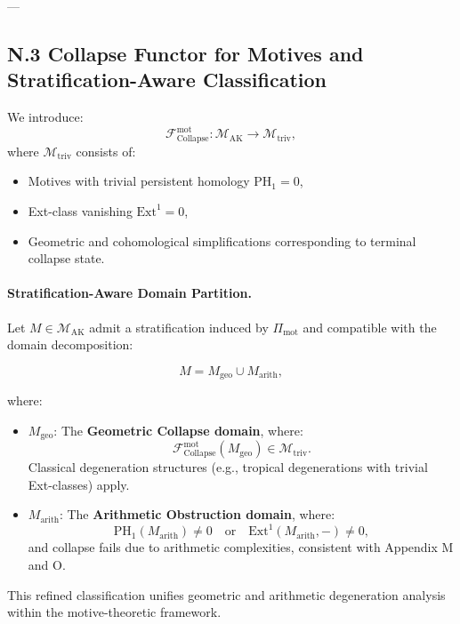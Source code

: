 \documentclass[11pt]{article}
\begin{document}
---

\subsection*{N.3 Collapse Functor for Motives and Stratification-Aware Classification}

We introduce:
\[
\mathcal{F}_{\mathrm{Collapse}}^{\mathrm{mot}} : \mathcal{M}_{\mathrm{AK}} \longrightarrow \mathcal{M}_{\mathrm{triv}},
\]
where \( \mathcal{M}_{\mathrm{triv}} \) consists of:
\begin{itemize}
  \item Motives with trivial persistent homology \( \mathrm{PH}_1 = 0 \),
  \item Ext-class vanishing \( \mathrm{Ext}^1 = 0 \),
  \item Geometric and cohomological simplifications corresponding to terminal collapse state.
\end{itemize}

\paragraph{Stratification-Aware Domain Partition.}

Let \( M \in \mathcal{M}_{\mathrm{AK}} \) admit a stratification induced by \( \Pi_{\mathrm{mot}} \) and compatible with the domain decomposition:

\[
M = M_{\mathrm{geo}} \cup M_{\mathrm{arith}},
\]

where:

\begin{itemize}
    \item \( M_{\mathrm{geo}} \): The \textbf{Geometric Collapse domain}, where:
    \[
    \mathcal{F}_{\mathrm{Collapse}}^{\mathrm{mot}}(M_{\mathrm{geo}}) \in \mathcal{M}_{\mathrm{triv}}.
    \]
    Classical degeneration structures (e.g., tropical degenerations with trivial Ext-classes) apply.

    \item \( M_{\mathrm{arith}} \): The \textbf{Arithmetic Obstruction domain}, where:
    \[
    \mathrm{PH}_1(M_{\mathrm{arith}}) \neq 0 \quad \text{or} \quad \mathrm{Ext}^1(M_{\mathrm{arith}}, -) \neq 0,
    \]
    and collapse fails due to arithmetic complexities, consistent with Appendix M and O.
\end{itemize}

This refined classification unifies geometric and arithmetic degeneration analysis within the motive-theoretic framework.
\end{document}
